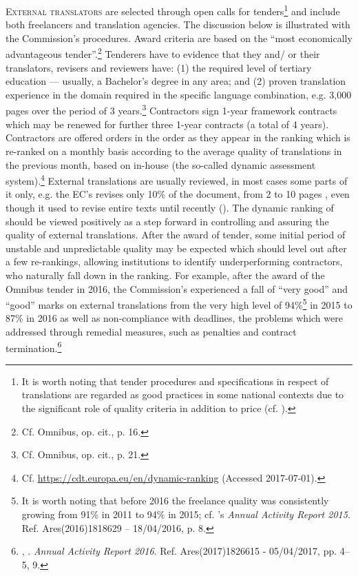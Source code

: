 \documentclass[output=paper]{langsci/langscibook}
\begin{document}
\textsc{External translators} are selected through open calls for tenders\footnote{It is worth noting that  tender procedures and specifications in respect of translations are regarded as good practices in some national contexts due to the significant role of quality criteria in addition to price (cf. \citealt{Wołoszyk2017}).} and include both freelancers and translation agencies. The discussion below is illustrated with the Commission’s procedures. Award criteria are based on the “most economically advantageous tender”.\footnote{Cf. Omnibus, op. cit., p. 16.} Tenderers have to evidence that they and/ or their translators, revisers and reviewers have: (1) the required level of tertiary education — usually, a Bachelor’s degree in any area; and (2) proven translation experience in the domain required in the specific language combination, e.g. 3,000 pages over the period of 3 years.\footnote{Cf. Omnibus, op. cit., p. 21.} Contractors sign 1-year framework contracts which may be renewed for further three 1-year contracts (a total of 4 years). Contractors are offered orders in the order as they appear in the ranking which is re-ranked on a monthly basis according to the average quality of translations in the previous month, based on in-house  (the so-called dynamic assessment system).\footnote{Cf. \url{https://cdt.europa.eu/en/dynamic-ranking} (Accessed 2017-07-01).} External translations are usually reviewed, in most cases some parts of it only, e.g. the EC’s  revises only 10\% of the document, from 2 to 10 pages \citep[17]{DGT2012}, even though it used to revise entire texts until recently (\citealt{Strandvik2017}). The dynamic ranking of  should be viewed positively as a step forward in controlling and assuring the quality of external translations. After the award of tender, some initial period of unstable and unpredictable quality may be expected which should level out after a few re{}-rankings, allowing institutions to identify underperforming contractors, who naturally fall down in the ranking. For example, after the award of the Omnibus tender in 2016, the Commission’s  experienced a fall of ``very good'' and ``good'' marks on external translations from the very high level of  94\%\footnote{It is worth noting that before 2016 the freelance quality was consistently growing from 91\% in 2011 to 94\% in 2015; cf. ’s \textit{Annual Activity Report 2015}. Ref. Ares(2016)1818629 – 18/04/2016, p. 8.} in 2015 to 87\% in 2016 as well as non-compliance with deadlines, the problems which were addressed through remedial measures, such as penalties and contract termination.\footnote{, . \textit{Annual Activity Report 2016}. Ref. Ares(2017)1826615 - 05/04/2017, pp. 4--5, 9.}
\end{document}
